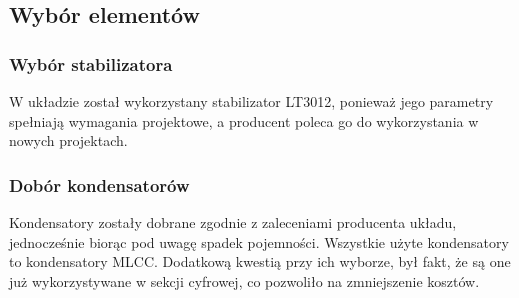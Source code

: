 \documentclass[11pt]{article}
\begin{document}
\subsection{Wybór elementów}
\subsubsection{Wybór stabilizatora}
W układzie został wykorzystany stabilizator LT3012, ponieważ jego parametry spełniają wymagania projektowe, a producent poleca go do wykorzystania w nowych projektach.

\subsubsection{Dobór kondensatorów}
Kondensatory zostały dobrane zgodnie z zaleceniami producenta układu, jednocześnie biorąc pod uwagę spadek pojemności. Wszystkie użyte kondensatory to kondensatory MLCC. Dodatkową kwestią przy ich wyborze, był fakt, że są one już wykorzystywane w sekcji cyfrowej, co pozwoliło na zmniejszenie kosztów.
\end{document}
